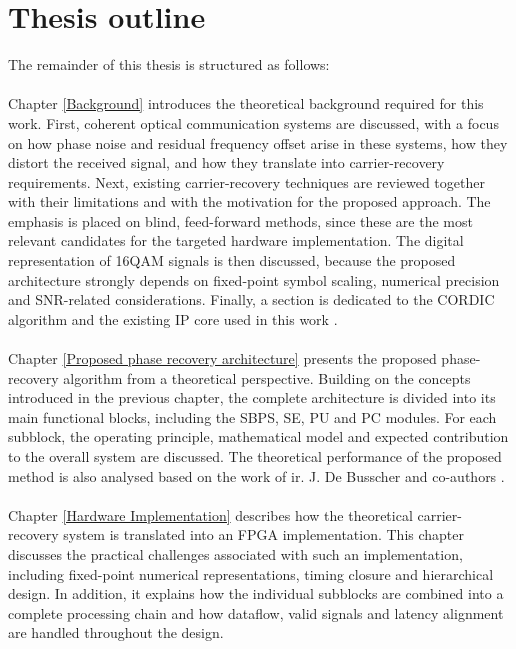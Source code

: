\section{Thesis outline}
The remainder of this thesis is structured as follows:
\\\\
Chapter \ref{Background} introduces the theoretical background required for this work. First, coherent optical communication systems are discussed, with a focus on how phase noise and residual frequency offset arise in these systems, how they distort the received signal, and how they translate into carrier-recovery requirements. Next, existing carrier-recovery techniques are reviewed together with their limitations and with the motivation for the proposed approach. The emphasis is placed on blind, feed-forward methods, since these are the most relevant candidates for the targeted hardware implementation. The digital representation of \ac{16QAM} signals is then discussed, because the proposed architecture strongly depends on fixed-point symbol scaling, numerical precision and \ac{SNR}-related considerations. Finally, a section is dedicated to the \ac{CORDIC} algorithm and the existing \ac{IP} core used in this work \cite{AMD2021PG105}.
\\\\
Chapter \ref{Proposed phase recovery architecture} presents the proposed phase-recovery algorithm from a theoretical perspective. Building on the concepts introduced in the previous chapter, the complete architecture is divided into its main functional blocks, including the \ac{SBPS}, \ac{SE}, \ac{PU} and \ac{PC} modules. For each subblock, the operating principle, mathematical model and expected contribution to the overall system are discussed. The theoretical performance of the proposed method is also analysed based on the work of ir. J. De Busscher and co-authors \cite{Jonas}.
\\\\
Chapter \ref{Hardware Implementation} describes how the theoretical carrier-recovery system is translated into an \ac{FPGA} implementation. This chapter discusses the practical challenges associated with such an implementation, including fixed-point numerical representations, timing closure and hierarchical design. In addition, it explains how the individual subblocks are combined into a complete processing chain and how dataflow, valid signals and latency alignment are handled throughout the design.
\\\\
